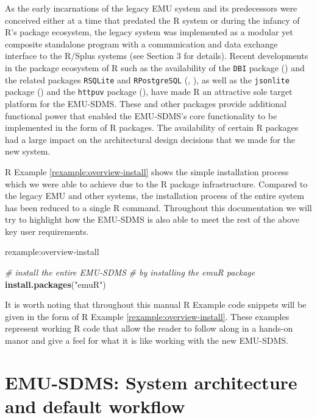 \documentclass[]{book}
\newenvironment{Shaded}{\begin{snugshade}}{\end{snugshade}}
\newcommand{\CommentTok}[1]{\textcolor[rgb]{0.56,0.35,0.01}{\textit{#1}}}
\newcommand{\KeywordTok}[1]{\textcolor[rgb]{0.13,0.29,0.53}{\textbf{#1}}}
\newcommand{\NormalTok}[1]{#1}
\newcommand{\StringTok}[1]{\textcolor[rgb]{0.31,0.60,0.02}{#1}}
\theoremstyle{definition}
\theoremstyle{definition}
\theoremstyle{definition}
\theoremstyle{remark}
\begin{document}
As the early incarnations of the legacy EMU system and its predecessors
were conceived either at a time that predated the R system or during the
infancy of R's package ecosystem, the legacy system was implemented as a
modular yet composite standalone program with a communication and data
exchange interface to the R/Splus systems (see \citet{cassidy:sc2001a}
Section 3 for details). Recent developments in the package ecosystem of
R such as the availability of the \texttt{DBI} package
(\citet{r-special-interest-group-on-databases-r-sig-db:2016a}) and the
related packages \texttt{RSQLite} and \texttt{RPostgreSQL}
(\citet{wickham:2014a}, \citet{conway:2016a}), as well as the
\texttt{jsonlite} package (\citet{ooms:as2014a}) and the \texttt{httpuv}
package (\citet{rstudio:2015a}), have made R an attractive sole target
platform for the EMU-SDMS. These and other packages provide additional
functional power that enabled the EMU-SDMS's core functionality to be
implemented in the form of R packages. The availability of certain R
packages had a large impact on the architectural design decisions that
we made for the new system.

R Example \ref{rexample:overview-install} shows the simple installation
process which we were able to achieve due to the R package
infrastructure. Compared to the legacy EMU and other systems, the
installation process of the entire system has been reduced to a single R
command. Throughout this documentation we will try to highlight how the
EMU-SDMS is also able to meet the rest of the above key user
requirements.

rexample:overview-install

\begin{Shaded}
\begin{Highlighting}[]
\CommentTok{# install the entire EMU-SDMS}
\CommentTok{# by installing the emuR package}
\KeywordTok{install.packages}\NormalTok{(}\StringTok{"emuR"}\NormalTok{)}
\end{Highlighting}
\end{Shaded}

It is worth noting that throughout this manual R Example code snippets
will be given in the form of R Example \ref{rexample:overview-install}.
These examples represent working R code that allow the reader to follow
along in a hands-on manor and give a feel for what it is like working
with the new EMU-SDMS.

\hypertarget{sec:overview-sysArch}{%
\section{EMU-SDMS: System architecture and default
workflow}\label{sec:overview-sysArch}}
\end{document}

